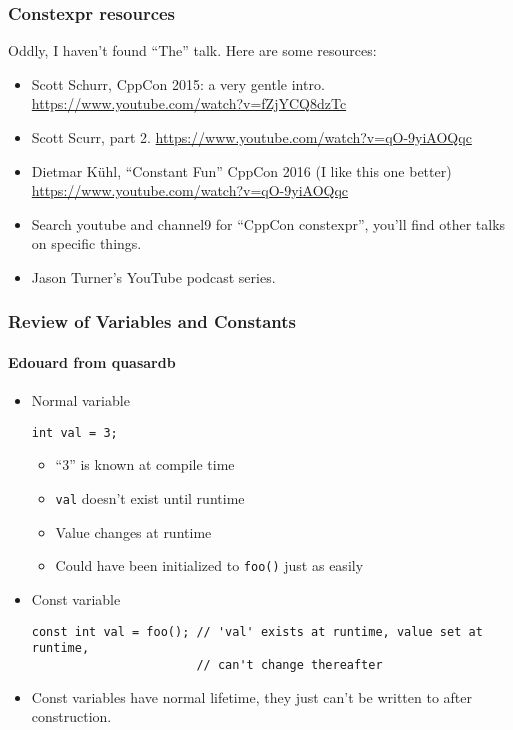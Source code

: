 \begin{frame}[fragile,t]
\frametitle{Constexpr resources}
Oddly, I haven't found ``The'' \cexpr talk.  Here are some resources:
\begin{itemize}[<+->]
\item Scott Schurr, CppCon 2015: a very gentle intro.
  \url{https://www.youtube.com/watch?v=fZjYCQ8dzTc}
\item Scott Scurr, part 2.
  \url{https://www.youtube.com/watch?v=qO-9yiAOQqc}
\item Dietmar K\"{u}hl, ``Constant Fun'' CppCon 2016 (I like this one better)
  \url{https://www.youtube.com/watch?v=qO-9yiAOQqc}
\item Search youtube and channel9 for ``CppCon constexpr'', you'll
  find other talks on specific things.
\item Jason Turner's YouTube podcast series.
\end{itemize}

\end{frame}


\begin{frame}[fragile,t]
\frametitle{Review of Variables and Constants}
\framesubtitle{Edouard from quasardb}
\begin{itemize}[<+->]
\item Normal variable
{\scriptsize\begin{verbatim}
int val = 3;
\end{verbatim}
}
\begin{itemize}[<+->]
  \item ``3'' is known at compile time
  \item \texttt{val} doesn't exist until runtime
  \item Value changes at runtime
  \item Could have been initialized to \texttt{foo()} just as easily
\end{itemize}
\vskip 24pt
\item Const variable
{\scriptsize\begin{verbatim}
const int val = foo(); // 'val' exists at runtime, value set at runtime,
                       // can't change thereafter

\end{verbatim}
}

\item[] Const variables have normal lifetime, they just can't be written
  to after construction.

\end{itemize}
\end{frame}

